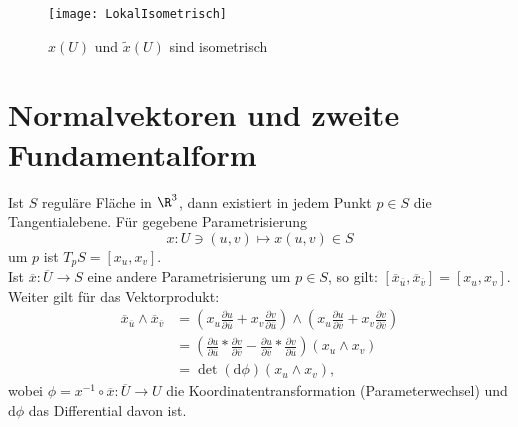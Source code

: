 \begin{figure}[H]
  \texttt{[image: LokalIsometrisch]}
  \caption{\( x(U) \) und \( \tilde{x}(U) \) sind isometrisch}
\end{figure}

\section{Normalvektoren und zweite Fundamentalform}

Ist \( S \) reguläre Fläche in \( \R^3 \), dann existiert in jedem Punkt \( p \in S \) die Tangentialebene. Für gegebene Parametrisierung 
\begin{equation*}
  x : U \ni (u,v) \mapsto x(u,v) \in S
\end{equation*}
um \( p \) ist \( T_p S = [x_u,x_v] \). \\
Ist \( \overline{x} : \overline{U} \to S \) eine andere Parametrisierung um \( p \in S \), so gilt: \( [\overline{x}_{\overline{u}},\overline{x}_{\overline{v}}] = [x_u,x_v] \). \\
Weiter gilt für das Vektorprodukt:
\begin{align*}
  \overline{x}_{\overline{u}} \wedge \overline{x}_{\overline{v}} &= \left( x_u\frac{\partial u}{\partial \overline{u}} + x_v\frac{\partial v}{\partial \overline{u}} \right) \wedge \left( x_u\frac{\partial u}{\partial \overline{v}} + x_v\frac{\partial v}{\partial \overline{v}} \right) \\
  &= \left( \frac{\partial u}{\partial \overline{u}}*\frac{\partial v}{\partial \overline{v}} - \frac{\partial u}{\partial \overline{v}}*\frac{\partial v}{\partial \overline{u}} \right) (x_u \wedge x_v) \\
  &= \det(\text{d}\phi)(x_u \wedge x_v)\text{,}
\end{align*}
wobei \( \phi = x^{-1} \circ \overline{x} : \overline{U} \to U \) die Koordinatentransformation (Parameterwechsel) und \( \text{d}\phi \) das Differential davon ist.

